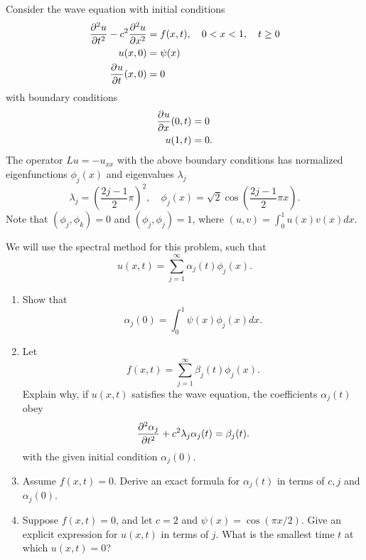 
Consider the wave equation with initial conditions
\begin{align*}
\frac{\partial^{2} u}{\partial t^{2}} - c^2\frac{\partial^{2} u}{\partial x^{2}} &= f(x,t), \quad 0 < x < 1, \quad t \geq 0\\
u(x,0) &= \psi(x)\\
\frac{\partial^{} u}{\partial t^{}}(x,0) &= 0
\end{align*}
with boundary conditions
\begin{align*}
\frac{\partial^{} u}{\partial x^{}}(0,t) &= 0\\
u(1,t) &= 0.
\end{align*}
The operator $Lu = -u_{xx}$ with the above boundary conditions has normalized eigenfunctions $\phi_j(x)$ and eigenvalues $\lambda_j$
\[
\lambda_j = \left(\frac{2j-1}{2}\pi\right)^2, \quad \phi_j(x) = \sqrt{2}\cos\left(\frac{2j-1}{2}\pi x\right).
\]
Note that $(\phi_j,\phi_k) = 0$ and $(\phi_j,\phi_j) = 1$, where $(u,v) = \int_0^1 u(x)v(x) dx$.  

We will use the spectral method for this problem, such that 
\[
u(x,t) = \sum_{j=1}^\infty \alpha_j(t)\phi_j(x).
\]
\begin{enumerate}
\item Show that
\[
\alpha_j(0) = \int_0^1 \psi(x)\phi_j(x) dx.
\]
\item Let 
\[
f(x,t) = \sum_{j=1}^\infty \beta_j(t) \phi_j(x).
\]
Explain why, if $u(x,t)$ satisfies the wave equation, the coefficients $\alpha_j(t)$ obey
\[
\frac{\partial^{2} \alpha_j}{\partial t^{2}} + c^2\lambda_j \alpha_j(t) = \beta_j(t).
\]
with the given initial condition $\alpha_j(0)$.  
\vspace{1em}
\item Assume $f(x,t) = 0$.  Derive an exact formula for $\alpha_j(t)$ in terms of $c, j$ and $\alpha_j(0)$.  
\vspace{1em}
\item Suppose $f(x,t) = 0$, and let $c=2$ and $\psi(x) = \cos(\pi x/2)$.  Give an explicit expression for $u(x,t)$ in terms of $j$.  What is the smallest time $t$ at which $u(x,t) = 0$?


\end{enumerate}


